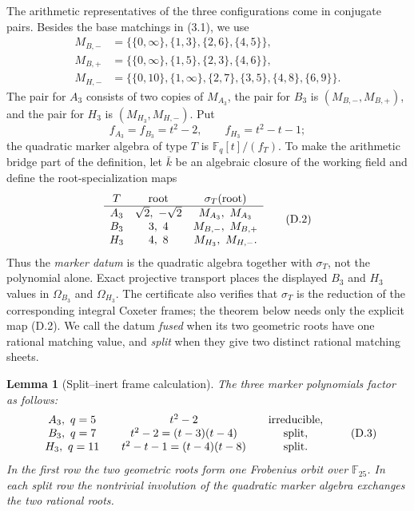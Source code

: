 \documentclass[11pt]{article}
\newtheorem{lemma}[theorem]{Lemma}
\theoremstyle{definition}
\theoremstyle{remark}
\newcommand{\F}{\mathbb{F}}
\begin{document}
The arithmetic representatives of the three configurations come in
conjugate pairs.  Besides the base matchings in (3.1), we use
\[
\begin{aligned}
 M_{B,-}&=\{\{0,\infty\},\{1,3\},\{2,6\},\{4,5\}\},\\
 M_{B,+}&=\{\{0,\infty\},\{1,5\},\{2,3\},\{4,6\}\},\\
 M_{H,-}&=\{\{0,10\},\{1,\infty\},\{2,7\},\{3,5\},
                   \{4,8\},\{6,9\}\}.
\end{aligned}                                             \tag{D.1}
\]
The pair for $A_3$ consists of two copies of $M_{A_3}$, the pair for
$B_3$ is $(M_{B,-},M_{B,+})$, and the pair for $H_3$ is
$(M_{H_3},M_{H,-})$.  Put
\[
 f_{A_3}=f_{B_3}=t^2-2,\qquad f_{H_3}=t^2-t-1;
\]
the quadratic marker algebra of type \(T\) is \(\F_q[t]/(f_T)\).
To make the arithmetic bridge part of the definition, let \(\bar k\) be
an algebraic closure of the working field
and define the root-specialization maps
\[
\begin{array}{c@{\quad}c@{\quad}c}
T&\text{root}&\sigma_T(\text{root})\\ \hline
A_3&\sqrt2,\ -\sqrt2&M_{A_3},\ M_{A_3}\\
B_3&3,\ 4&M_{B,-},\ M_{B,+}\\
H_3&4,\ 8&M_{H_3},\ M_{H,-}.
\end{array}                                               \tag{D.2}
\]
Thus the \emph{marker datum} is the quadratic algebra together with
\(\sigma_T\), not the polynomial alone.  Exact projective transport
places the displayed $B_3$ and $H_3$ values in
\(\Omega_{B_3}\) and \(\Omega_{H_3}\).  The certificate also verifies
that \(\sigma_T\) is the reduction of the corresponding integral
Coxeter frames; the theorem below needs only the explicit map (D.2).
We call the datum \emph{fused} when its two geometric roots have one
rational matching value, and \emph{split} when they give two distinct
rational matching sheets.

\begin{lemma}[Split--inert frame calculation]
\label{lem:split-inert-frames}
The three marker polynomials factor as follows:
\[
\begin{array}{c@{\qquad}c@{\qquad}c}
A_3,\ q=5&t^2-2&\text{irreducible},\\
B_3,\ q=7&t^2-2=(t-3)(t-4)&\text{split},\\
H_3,\ q=11&t^2-t-1=(t-4)(t-8)&\text{split}.
\end{array}                                               \tag{D.3}
\]
In the first row the two geometric roots form one Frobenius orbit over
$\F_{25}$.  In each split row the nontrivial involution of the
quadratic marker algebra exchanges the two rational roots.
\end{lemma}
\end{document}
